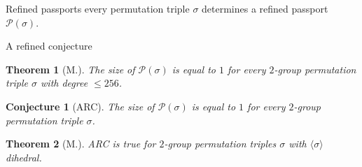 \documentclass[xcolor=dvipsnames]{beamer}
\theoremstyle{plain}
\newtheorem*{thm}{Theorem}
\newtheorem*{conj}{Conjecture}
\begin{document}
{\begin{frame}{Refined passports}
      every permutation triple $\sigma$
      determines a refined passport
      $\mathscr{P}(\sigma)$.
    \end{frame}
    \begin{frame}{A refined conjecture}
      \begin{thm}[M.]
        \vspace{1pt}
        The size of $\mathscr{P}(\sigma)$ is
        equal to $1$ for every
        $2$-group permutation triple
        $\sigma$ with degree $\leq 256$.
      \end{thm}
      \pause\par
      \begin{conj}[ARC]
        \vspace{1pt}
        The size of $\mathscr{P}(\sigma)$ is
        equal to $1$ for every
        $2$-group permutation triple $\sigma$.
      \end{conj}
      \pause\par
      \begin{thm}[M.]
        \vspace{1pt}
        ARC is true for $2$-group permutation triples $\sigma$
        with $\langle\sigma\rangle$ dihedral.
      \end{thm}
    \end{frame}
  }
\end{document}
